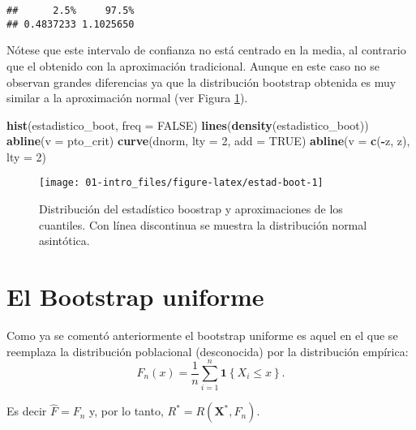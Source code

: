 \documentclass[
]{book}
\newenvironment{Shaded}{\begin{snugshade}}{\end{snugshade}}
\newcommand{\DataTypeTok}[1]{\textcolor[rgb]{0.13,0.29,0.53}{#1}}
\newcommand{\DecValTok}[1]{\textcolor[rgb]{0.00,0.00,0.81}{#1}}
\newcommand{\KeywordTok}[1]{\textcolor[rgb]{0.13,0.29,0.53}{\textbf{#1}}}
\newcommand{\NormalTok}[1]{#1}
\newcommand{\OperatorTok}[1]{\textcolor[rgb]{0.81,0.36,0.00}{\textbf{#1}}}
\newcommand{\OtherTok}[1]{\textcolor[rgb]{0.56,0.35,0.01}{#1}}
\theoremstyle{break}
\theoremstyle{definition}
\theoremstyle{definition}
\theoremstyle{definition}
\theoremstyle{remark}
\begin{document}
\begin{verbatim}
##      2.5%     97.5% 
## 0.4837233 1.1025650
\end{verbatim}

Nótese que este intervalo de confianza no está centrado en la media,
al contrario que el obtenido con la aproximación tradicional.
Aunque en este caso no se observan grandes diferencias ya que
la distribución bootstrap obtenida es muy similar a la aproximación normal
(ver Figura \ref{fig:estad-boot}).

\begin{Shaded}
\begin{Highlighting}[]
\KeywordTok{hist}\NormalTok{(estadistico_boot, }\DataTypeTok{freq =} \OtherTok{FALSE}\NormalTok{)}
\KeywordTok{lines}\NormalTok{(}\KeywordTok{density}\NormalTok{(estadistico_boot))}
\KeywordTok{abline}\NormalTok{(}\DataTypeTok{v =}\NormalTok{ pto_crit)}
\KeywordTok{curve}\NormalTok{(dnorm, }\DataTypeTok{lty =} \DecValTok{2}\NormalTok{, }\DataTypeTok{add =} \OtherTok{TRUE}\NormalTok{)}
\KeywordTok{abline}\NormalTok{(}\DataTypeTok{v =} \KeywordTok{c}\NormalTok{(}\OperatorTok{-}\NormalTok{z, z), }\DataTypeTok{lty =} \DecValTok{2}\NormalTok{)}
\end{Highlighting}
\end{Shaded}

\begin{figure}[!htb]

{\centering \texttt{[image: 01-intro\_files/figure-latex/estad-boot-1]} 

}

\caption{Distribución del estadístico boostrap y aproximaciones de los cuantiles. Con línea discontinua se muestra la distribución normal asintótica.}\label{fig:estad-boot}
\end{figure}

\hypertarget{intro-unif}{%
\section{El Bootstrap uniforme}\label{intro-unif}}

Como ya se comentó anteriormente el bootstrap uniforme es aquel en el que
se reemplaza la distribución poblacional (desconocida) por la distribución
empírica:
\[F_n\left( x \right) =\frac{1}{n}\sum_{i=1}^{n}\mathbf{1}\left\{ X_i\leq x\right\}.\]

Es decir \(\hat{F}=F_n\) y, por lo tanto,
\(R^{\ast}=R\left( \mathbf{X}^{\ast},F_n \right)\).
\end{document}
